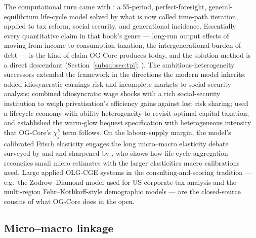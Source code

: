 The computational turn came with \citet{AuerbachKotlikoff1987}: a 55-period, perfect-foresight, general-equilibrium life-cycle model solved by what is now called time-path iteration, applied to tax reform, social security, and generational incidence. Essentially every quantitative claim in that book's genre --- long-run output effects of moving from income to consumption taxation, the intergenerational burden of debt --- is the kind of claim OG-Core produces today, and the solution method is a direct descendant (Section~\ref{subsubsec:tpi}; \citealp{EvansPhillips2014}). The ambitious-heterogeneity successors extended the framework in the directions the modern model inherits: \citet{ImrohorogluImrohorogluJoines1995} added idiosyncratic earnings risk and incomplete markets to social-security analysis; \citet{NishiyamaSmetters2007} combined idiosyncratic wage shocks with a rich social-security institution to weigh privatisation's efficiency gains against lost risk sharing; \citet{ConesaKitaoKrueger2009} used a lifecycle economy with ability heterogeneity to revisit optimal capital taxation; and \citet{DeNardi2004} established the warm-glow bequest specification with heterogeneous intensity that OG-Core's $\chi^b_j$ term follows. On the labour-supply margin, the model's calibrated Frisch elasticity engages the long micro--macro elasticity debate surveyed by \citet{BlundellMaCurdy1999} and \citet{BlundellMaCurdyMeghir2007} and sharpened by \citet{Peterman2016}, who shows how life-cycle aggregation reconciles small micro estimates with the larger elasticities macro calibrations need. Large applied OLG-CGE systems in the consulting-and-scoring tradition --- e.g.\ the Zodrow--Diamond model used for US corporate-tax analysis \citep{ZodrowDiamond2013} and the multi-region Fehr--Kotlikoff-style demographic models \citep{KotlikoffSmettersWalliser2007} --- are the closed-source cousins of what OG-Core does in the open.

\subsection{Micro--macro linkage}
\label{subsec:micromacro}

